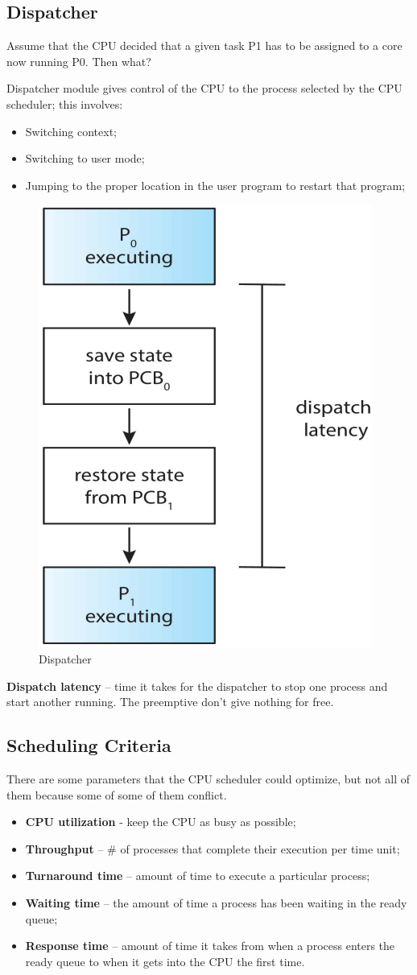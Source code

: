 \subsection{Dispatcher}
Assume that the CPU decided that a given task P1 has to be assigned to a core now running P0. Then what?

Dispatcher module gives control of the
CPU to the process selected by the CPU
scheduler; this involves:

\begin{itemize}
    \item Switching context;
    \item Switching to user mode;
    \item Jumping to the proper location in the user program to restart that program;
\end{itemize}

\begin{figure}[htbp]
    \centering
    \includegraphics[width=0.3\linewidth]{img/dispacher.png}
    \caption{Dispatcher}    
\end{figure}

\textbf{Dispatch latency} – time it takes for the dispatcher to stop one process and start another running. The preemptive don't give nothing for free.

\subsection{Scheduling Criteria}

There are some parameters that the CPU scheduler could optimize, but not all of them because some of some of them conflict.

\begin{itemize}
    \item \textbf{CPU utilization} - keep the CPU as busy as possible;
    \item \textbf{Throughput} – \# of processes that complete their execution per time unit;
    \item \textbf{Turnaround time} – amount of time to execute a particular process;
    \item \textbf{Waiting time} – the amount of time a process has been waiting in the ready queue;
    \item \textbf{Response time} – amount of time it takes from when a process enters the ready queue to when it gets into the CPU the first time. 
\end{itemize}

